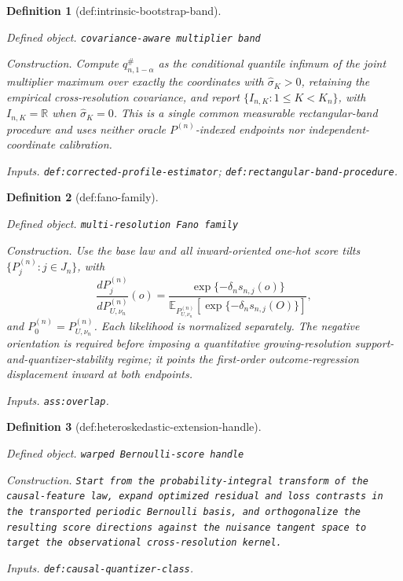 \documentclass{article}
\newtheorem{definition}{Definition}
\begin{document}
\begin{definition}[def:intrinsic-bootstrap-band]\label{def:intrinsic-bootstrap-band}
\par\smallskip\noindent\emph{Defined object.} \texttt{covariance-\allowbreak{}aware multiplier band}
\par\smallskip\noindent\emph{Construction.} Compute \(q_{n,1-\alpha}^{\#}\) as the conditional quantile infimum of the joint multiplier maximum over exactly the coordinates with \(\widehat\sigma_K>0\), retaining the empirical cross-resolution covariance, and report \(\{I_{n,K}:1\le K<K_n\}\), with \(I_{n,K}=\mathbb R\) when \(\widehat\sigma_K=0\). This is a single common measurable rectangular-band procedure and uses neither oracle \(P^{(n)}\)-indexed endpoints nor independent-coordinate calibration.
\par\smallskip\noindent\emph{Inputs.} \texttt{def:\allowbreak{}corrected-\allowbreak{}profile-\allowbreak{}estimator}; \texttt{def:\allowbreak{}rectangular-\allowbreak{}band-\allowbreak{}procedure}.
\end{definition}

\begin{definition}[def:fano-family]\label{def:fano-family}
\par\smallskip\noindent\emph{Defined object.} \texttt{multi-\allowbreak{}resolution Fano family}
\par\smallskip\noindent\emph{Construction.} Use the base law and all inward-oriented one-hot score tilts \(\{P_j^{(n)}:j\in J_n\}\), with
\[
 \frac{dP_j^{(n)}}{dP_{U,\nu_n}^{(n)}}(o)
 =\frac{\exp\{-\delta_n s_{n,j}(o)\}}
 {\mathbb E_{P_{U,\nu_n}^{(n)}}[\exp\{-\delta_n s_{n,j}(O)\}]},
\]
and \(P_0^{(n)}=P_{U,\nu_n}^{(n)}\).  Each likelihood is normalized separately.  The negative orientation is required before imposing a quantitative growing-resolution support-and-quantizer-stability regime; it points the first-order outcome-regression displacement inward at both endpoints.
\par\smallskip\noindent\emph{Inputs.} \texttt{ass:\allowbreak{}overlap}.
\end{definition}

\begin{definition}[def:heteroskedastic-extension-handle]\label{def:heteroskedastic-extension-handle}
\par\smallskip\noindent\emph{Defined object.} \texttt{warped Bernoulli-\allowbreak{}score handle}
\par\smallskip\noindent\emph{Construction.} \texttt{Start from the probability-\allowbreak{}integral transform of the causal-\allowbreak{}feature law,\allowbreak{} expand optimized residual and loss contrasts in the transported periodic Bernoulli basis,\allowbreak{} and orthogonalize the resulting score directions against the nuisance tangent space to target the observational cross-\allowbreak{}resolution kernel.}
\par\smallskip\noindent\emph{Inputs.} \texttt{def:\allowbreak{}causal-\allowbreak{}quantizer-\allowbreak{}class}.
\end{definition}
\end{document}
